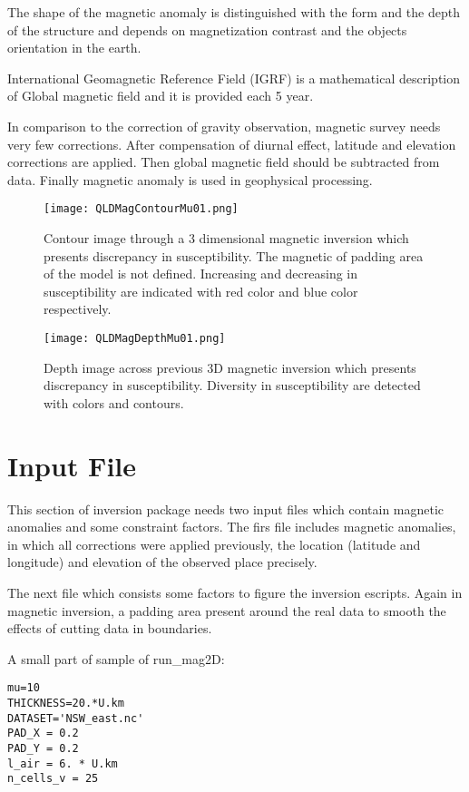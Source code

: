 The shape of the magnetic anomaly is distinguished with the form and the depth of the structure and depends on magnetization contrast and the objects orientation in the earth.

International Geomagnetic Reference Field (IGRF) is a mathematical description of Global magnetic field and it  is provided each 5 year.

In comparison to the correction of gravity observation, magnetic survey needs very few corrections. After compensation of diurnal effect, latitude and elevation corrections are applied. Then global magnetic field should be subtracted from data. Finally magnetic anomaly is used in geophysical processing.

\begin{figure}
\centering
\texttt{[image: QLDMagContourMu01.png]}
\caption{Contour image through a 3 dimensional magnetic inversion which presents discrepancy in susceptibility. The magnetic of padding area of the model is not defined. Increasing and decreasing in susceptibility are indicated with red color and blue color respectively.}
\end{figure}

\begin{figure}
\centering
\texttt{[image: QLDMagDepthMu01.png]}
\caption{Depth image across previous 3D magnetic inversion which presents discrepancy in susceptibility. Diversity in susceptibility are detected with colors and contours.}
\end{figure}

\section{Input File} 
This section of inversion package needs two input files which contain magnetic anomalies and some constraint factors. The firs file includes magnetic anomalies, in which all corrections were applied previously, the location (latitude and longitude) and elevation of the observed place precisely.

The next file which consists some factors to figure the inversion escripts. Again in magnetic inversion, a padding area present around the real data to smooth the effects of cutting data in boundaries.
 
A small part of sample of run_mag2D:

\begin{verbatim}
mu=10
THICKNESS=20.*U.km
DATASET='NSW_east.nc'
PAD_X = 0.2
PAD_Y = 0.2
l_air = 6. * U.km
n_cells_v = 25
\end{verbatim}

